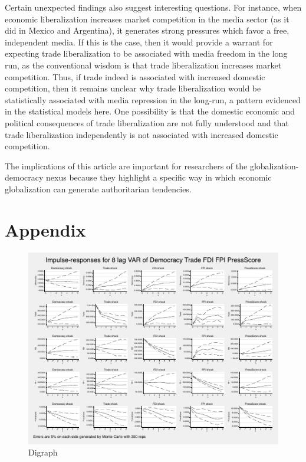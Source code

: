 \documentclass[12pt,a4paper]{article}\usepackage[]{graphicx}\usepackage[]{color}
\begin{document}
Certain unexpected findings also suggest interesting questions. For instance, when economic liberalization increases market competition in the media sector (as it did in Mexico and Argentina), it generates strong pressures which favor a free, independent media. If this is the case, then it would provide a warrant for expecting trade liberalization to be associated with media freedom in the long run, as the conventional wisdom is that trade liberalization increases market competition. Thus, if trade indeed is associated with increased domestic competition, then it remains unclear why trade liberalization would be statistically associated with media repression in the long-run, a pattern evidenced in the statistical models here. One possibility is that the domestic economic and political consequences of trade liberalization are not fully understood and that trade liberalization independently is not associated with increased domestic competition.

The implications of this article are important for researchers of the globalization-democracy nexus because they highlight a specific way in which economic globalization can generate authoritarian tendencies.


\pagebreak

\section{Appendix}



\begin{figure}[!htb]
\begin{center}
\includegraphics[width=1\textwidth]{grcombine1.pdf}
\caption{Digraph}
\end{center}
\end{figure}


\begingroup
{}
\setlength\bibitemsep{7pt}




\printbibliography
\endgroup
\end{document}
